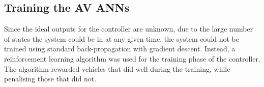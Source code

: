 \subsection{Training the \ac{AV} \acp{ANN}}
Since the ideal outputs for the controller are unknown, due to the large number of states the system could be in at any given time, the system could not be trained using standard back-propagation with gradient descent.
Instead, a reinforcement learning algorithm was used for the training phase of the controller.
The algorithm rewarded vehicles that did well during the training, while penalising those that did not.




